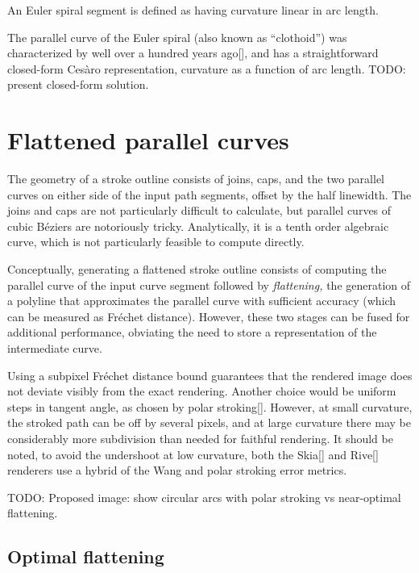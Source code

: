 \documentclass[sigconf, authordraft]{acmart}
\begin{document}
An Euler spiral segment is defined as having curvature linear in arc length.

The parallel curve of the Euler spiral (also known as ``clothoid'') was characterized by \citet{Wieleitner1907} well over a hundred years ago[], and has a straightforward closed-form Cesàro representation, curvature as a function of arc length. TODO: present closed-form solution.

\section{Flattened parallel curves}

The geometry of a stroke outline consists of joins, caps, and the two parallel curves on either side of the input path segments, offset by the half linewidth. The joins and caps are not particularly difficult to calculate, but parallel curves of cubic Béziers are notoriously tricky. Analytically, it is a tenth order algebraic curve, which is not particularly feasible to compute directly.

Conceptually, generating a flattened stroke outline consists of computing the parallel curve of the input curve segment followed by \emph{flattening,} the generation of a polyline that approximates the parallel curve with sufficient accuracy (which can be measured as Fréchet distance). However, these two stages can be fused for additional performance, obviating the need to store a representation of the intermediate curve.

Using a subpixel Fréchet distance bound guarantees that the rendered image does not deviate visibly from the exact rendering. Another choice would be uniform steps in tangent angle, as chosen by polar stroking[]. However, at small curvature, the stroked path can be off by several pixels, and at large curvature there may be considerably more subdivision than needed for faithful rendering. It should be noted, to avoid the undershoot at low curvature, both the Skia[] and Rive[] renderers use a hybrid of the Wang and polar stroking error metrics.

TODO: Proposed image: show circular arcs with polar stroking vs near-optimal flattening.

\subsection{Optimal flattening}
\end{document}
